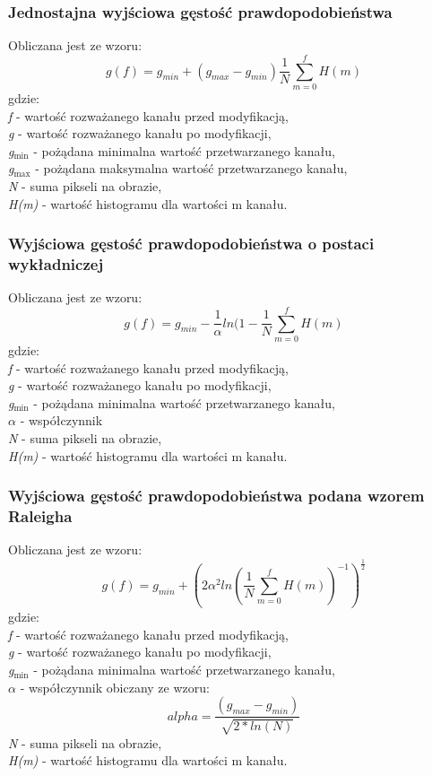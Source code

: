 \documentclass{classrep}
\begin{document}
\subsubsection{Jednostajna wyjściowa gęstość prawdopodobieństwa}
Obliczana jest ze wzoru:
\[ g(f) = g_{min} + (g_{max} - g_{min}) \frac{1}{N} \displaystyle\sum_{m=0}^{f} H(m) \]
gdzie:\\
\textit{f} - wartość rozważanego kanału przed modyfikacją,\\
\textit{g} - wartość rozważanego kanału po modyfikacji,\\
\textit{g$_{\text{min}}$} - pożądana minimalna wartość przetwarzanego kanału,\\
\textit{g$_{\text{max}}$} - pożądana maksymalna wartość przetwarzanego kanału,\\
\textit{N} - suma pikseli na obrazie,\\
\textit{H(m)} - wartość histogramu dla wartości m kanału.\\

\subsubsection{Wyjściowa gęstość prawdopodobieństwa o postaci wykładniczej}
Obliczana jest ze wzoru:
\[ g(f) = g_{min} - \frac{1}{\alpha} ln (1 - \frac{1}{N} \displaystyle\sum_{m=0}^{f} H(m) \]
gdzie:\\
\textit{f} - wartość rozważanego kanału przed modyfikacją,\\
\textit{g} - wartość rozważanego kanału po modyfikacji,\\
\textit{g$_{\text{min}}$} - pożądana minimalna wartość przetwarzanego kanału,\\
\textit{$\alpha$} - współczynnik\\
\textit{N} - suma pikseli na obrazie,\\
\textit{H(m)} - wartość histogramu dla wartości m kanału.\\

\subsubsection{Wyjściowa gęstość prawdopodobieństwa podana wzorem Raleigha}
Obliczana jest ze wzoru:
\[ g(f) = g_{min} + (2 \alpha^2 ln (\frac{1}{N} \displaystyle\sum_{m=0}^{f} H(m))^{-1})^\frac{1}{2} \]
gdzie:\\
\textit{f} - wartość rozważanego kanału przed modyfikacją,\\
\textit{g} - wartość rozważanego kanału po modyfikacji,\\
\textit{g$_{\text{min}}$} - pożądana minimalna wartość przetwarzanego kanału,\\
\textit{$\alpha$} - współczynnik obiczany ze wzoru:
\[ alpha = \frac{(g_{max} - g_{min})}{\sqrt{2 \ast ln(N)}} \]
\textit{N} - suma pikseli na obrazie,\\
\textit{H(m)} - wartość histogramu dla wartości m kanału.\\
\end{document}
